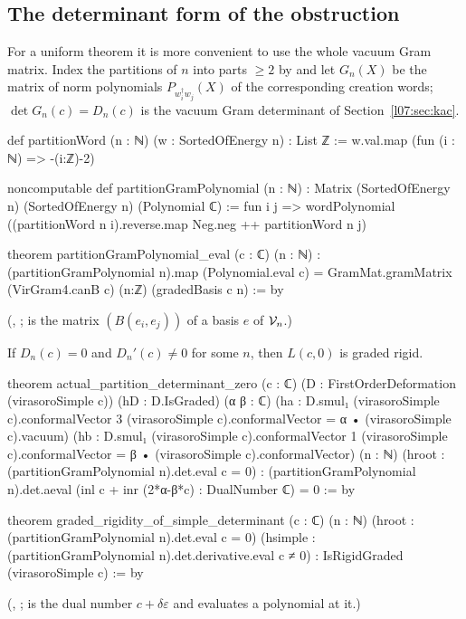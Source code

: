 \subsection{The determinant form of the obstruction}

For a uniform theorem it is more convenient to use the whole vacuum Gram matrix. Index the partitions of
$n$ into parts $\ge2$ by  and let $G_n(X)$ be the matrix of norm polynomials
$P_{w_i^\dagger w_j}(X)$ of the corresponding creation words; $\det G_n(c) = D_n(c)$ is the vacuum Gram
determinant of Section~\ref{l07:sec:kac}.
\begin{leancode}
def partitionWord (n : ℕ) (w : SortedOfEnergy n) : List ℤ :=
  w.val.map (fun (i : ℕ) => -(i:ℤ)-2)

noncomputable def partitionGramPolynomial (n : ℕ) :
    Matrix (SortedOfEnergy n) (SortedOfEnergy n) (Polynomial ℂ) :=
  fun i j => wordPolynomial ((partitionWord n i).reverse.map Neg.neg ++ partitionWord n j)

theorem partitionGramPolynomial_eval (c : ℂ) (n : ℕ) :
    (partitionGramPolynomial n).map (Polynomial.eval c) =
      GramMat.gramMatrix (VirGram4.canB c) (n:ℤ) (gradedBasis c n) := by
\end{leancode}
(, ;
 is the matrix $(B(e_i,e_j))$ of a basis $e$ of $\mathcal{V}_n$.)

\begin{theorem}\label{l07:thm:det}
If $D_n(c) = 0$ and $D_n'(c)\ne0$ for some $n$, then $L(c,0)$ is graded rigid.
\end{theorem}
\begin{leancode}
theorem actual_partition_determinant_zero (c : ℂ)
    (D : FirstOrderDeformation (virasoroSimple c)) (hD : D.IsGraded)
    (α β : ℂ)
    (ha : D.smul₁ (virasoroSimple c).conformalVector 3
      (virasoroSimple c).conformalVector = α • (virasoroSimple c).vacuum)
    (hb : D.smul₁ (virasoroSimple c).conformalVector 1
      (virasoroSimple c).conformalVector = β • (virasoroSimple c).conformalVector)
    (n : ℕ) (hroot : (partitionGramPolynomial n).det.eval c = 0) :
    (partitionGramPolynomial n).det.aeval (inl c + inr (2*α-β*c) : DualNumber ℂ) = 0 := by

theorem graded_rigidity_of_simple_determinant (c : ℂ) (n : ℕ)
    (hroot : (partitionGramPolynomial n).det.eval c = 0)
    (hsimple : (partitionGramPolynomial n).det.derivative.eval c ≠ 0) :
    IsRigidGraded (virasoroSimple c) := by
\end{leancode}
(, ;
 is the dual number $c+\delta\varepsilon$ and  evaluates a polynomial at it.)

